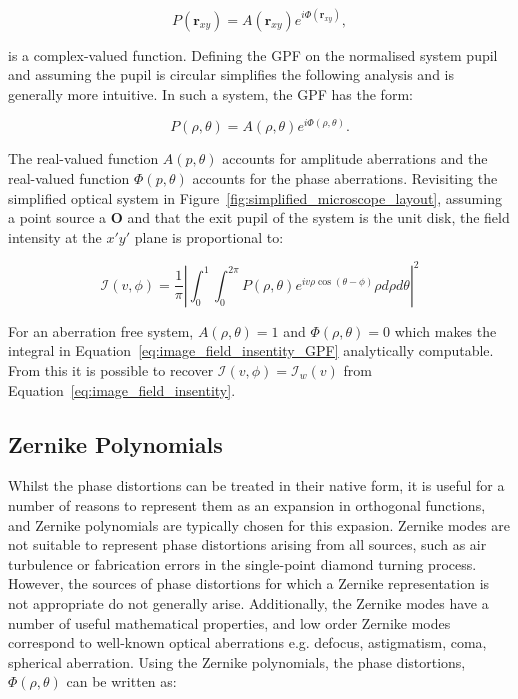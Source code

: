 \begin{equation}\label{eq:GPF}
P\left(\textbf{r}_{xy}\right) = A\left(\textbf{r}_{xy}\right)e^{i\Phi\left(\textbf{r}_{xy}\right)},
\end{equation}

is a complex-valued function. Defining the GPF on the normalised system 
pupil and assuming the pupil is circular simplifies the following analysis
and is generally more intuitive. In such a system, the GPF has the form:

\begin{equation}\label{eq:GPF_polar}
P\left(\rho,\theta\right) = A\left(\rho,\theta\right)e^{i\Phi\left(\rho,\theta\right)}.
\end{equation}

The real-valued function $A\left(p,\theta\right)$ accounts for amplitude
aberrations and the real-valued function $\Phi\left(p,\theta\right)$ 
accounts for the phase aberrations. Revisiting the simplified optical
system in Figure~\ref{fig:simplified_microscope_layout}, assuming a point
source a $\textbf{O}$ and that the exit pupil of the system is the unit 
disk, the field intensity at the $x'y'$ plane is proportional 
to\cite{goodman2005introduction,born2013principles}:

\begin{equation}\label{eq:image_field_insentity_GPF}
\mathcal{I}(v,\phi) = \frac{1}{\pi}\left|\int^{1}_{0}\int^{2\pi}_{0}P\left(\rho,\theta\right)e^{iv\rho\cos(\theta-\phi)}\rho d\rho d\theta\right|^{2}
\end{equation}

For an aberration free system, $A\left(\rho,\theta\right) = 1$ and 
$\Phi\left(\rho,\theta\right) = 0$ which makes the integral in 
Equation~\ref{eq:image_field_insentity_GPF} analytically computable. From 
this it is possible to recover $\mathcal{I}(v,\phi) = \mathcal{I}_{w}(v)$
from Equation~\ref{eq:image_field_insentity}.

\subsection{Zernike Polynomials}
\label{subsec:zernike}

Whilst the phase distortions can be treated in their native form, it is 
useful for a number of reasons to represent them as an expansion in
orthogonal functions, and Zernike polynomials are typically chosen for 
this expasion\cite{zernike1934diffraction,noll1976zernike,mahajan1994zernike}.
Zernike modes are not suitable to represent phase distortions arising 
from all sources, such as air turbulence or fabrication errors in the 
single-point diamond turning process\cite{wyant1992basic}. However, the 
sources of phase distortions for which a Zernike representation is not
appropriate do not generally arise. Additionally, the Zernike modes have 
a number of useful mathematical properties, and low order Zernike modes 
correspond to well-known optical aberrations e.g. defocus, astigmatism, 
coma, spherical 
aberration\cite{born2013principles,booth2007adaptive,zernike1934diffraction}.
Using the Zernike polynomials, the phase distortions, $\Phi\left(\rho,\theta\right)$
can be written as:

